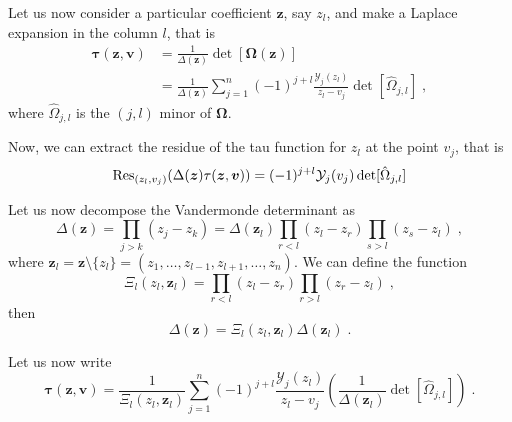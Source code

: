 \documentclass[a4paper,11pt]{amsart}
\begin{document}
Let us now consider a particular coefficient \(\bm{z}\), say \(z_l\), and
make a Laplace expansion in the column \(l\), that is
\begin{equation}
\begin{split}
  \bm{\tau}(\bm{z}, \bm{v})
  & = \frac{1}{\Delta(\bm{z})} \det[\bm{\Omega}(\bm{z}) ] \\
  & = \frac{1}{\Delta(\bm{z})} \sum_{j=1}^n (-1)^{j + l} \frac{\mathcal{Y}_j(z_l)}{z_l - v_j  } 
  \det[\hat{\Omega}_{j, l}]\; ,
\end{split}
\end{equation}
where \(\hat{\Omega}_{j,l} \) is the \((j, l)\) minor of \(\bm{\Omega}\).

Now, we can extract the residue of the tau function for \(z_l\) at the point \(v_j\), that is
\begin{equation}
  \operatorname{Res}_{(z_l, v_j)}(\Delta(\bm{z})\tau(\bm{z}, \bm{v})) = (-1)^{j+l} \mathcal{Y}_j(v_j) \det[\hat{\Omega}_{j, l}]
\end{equation}

Let us now decompose the Vandermonde determinant as
\begin{equation}
  \Delta(\bm{z}) = \prod_{j>k}(z_j - z_k) = \Delta(\bm{z}_l) \prod_{r<l}(z_l - z_r) \prod_{s>l}(z_s - z_l)\; ,
\end{equation}
where \(\bm{z}_l = \bm{z}\setminus \{z_l\} = (z_1, \dots, z_{l-1}, z_{l+1}, \dots, z_n) \).
We can define the function
\begin{equation}
  \Xi_l(z_l,\bm{z}_l) = \prod_{r<l}(z_l - z_r) \prod_{r>l}(z_r - z_l)\; , 
\end{equation}
then 
\begin{equation}
  \Delta(\bm{z}) = \Xi_l(z_l, \bm{z}_l) \Delta(\bm{z}_l) \; .
\end{equation}

Let us now write
\begin{equation}
  \bm{\tau}(\bm{z}, \bm{v})
   = \frac{1}{\Xi_l(z_l, \bm{z}_l)} \sum_{j=1}^n (-1)^{j + l} \frac{\mathcal{Y}_j(z_l)}{z_l - v_j} 
\left(\frac{1}{\Delta(\bm{z}_l)} \det[\hat{\Omega}_{j, l}]\right)\; .
\end{equation}
\end{document}
